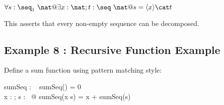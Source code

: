 \documentclass[a4paper,10pt,fleqn]{article}
\begin{document}
\bigskip

\noindent
$\forall s : \seq_1~\nat @ \exists x : \nat; t : \seq~\nat @ s = \langle x \rangle \cat t$


\noindent This asserts that every non-empty sequence can be decomposed.

\bigskip

\subsection*{Example 8 : Recursive Function Example}

\noindent Define a sum function using pattern matching style:

\bigskip

\begin{axdef}
sumSeq : \seq~\nat \fun \nat
\where
sumSeq(\langle \rangle) = 0 \\
\forall x : \nat; s : \seq~\nat @ sumSeq(\langle x \rangle \cat s) = x + sumSeq(s)
\end{axdef}
\end{document}
